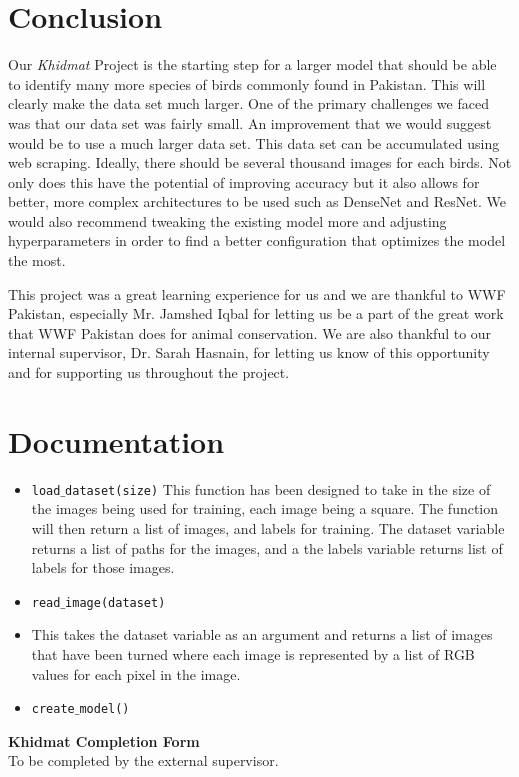 \documentclass[11pt]{article}
\begin{document}
\section{Conclusion}%
\label{sec:conclusion}
Our \textit{Khidmat} Project is the starting step for a larger model that should be able 
to identify many more species of birds commonly found in Pakistan. This will clearly make
the data set much larger. One of the primary challenges we faced was that our data set was fairly
small. An improvement that we would suggest would be to use a much larger data set. This data 
set can be accumulated using web scraping. Ideally, there should be several thousand 
images for each birds. Not only does this have the potential of improving accuracy but it also 
allows for better, more complex architectures to be used such as DenseNet and ResNet.
We would also recommend tweaking the existing model more and adjusting hyperparameters in 
order to find a better configuration that optimizes the model the most.

This project was a great learning experience for us and we are thankful to WWF Pakistan, 
especially Mr. Jamshed Iqbal for letting us be a part of the great work that WWF Pakistan does 
for animal conservation. We are also thankful to our internal supervisor, Dr. Sarah Hasnain, 
for letting us know of this opportunity and for supporting us throughout the project.

\newpage
\appendix
\section{Documentation}
\begin{itemize}
  \item \texttt{load$\_$dataset(size)}
  This function has been designed to take in the size of the images being used for training, each image being a square. The function will then return a list of images, and labels for training. The dataset variable returns a list of paths for the images, and a the labels variable returns list of labels for those images.
  \item \texttt{read$\_$image(dataset)}
  \item This takes the dataset variable as an argument and returns a list of images that have been turned where each image is represented by a list of RGB values for each pixel in the image.
  \item \texttt{create$\_$model()}
\end{itemize}
\newpage
\begin{center}
  {\Large\bf Khidmat Completion Form}\\[5pt]
  \small To be completed by the external supervisor.  
\end{center}
\bigskip
\end{document}
